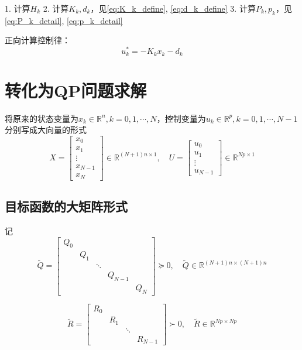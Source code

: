 \documentclass[withoutpreface,bwprint]{NoteBook}
\begin{document}
1. 计算$H_k$
2. 计算$K_k,d_k$，见\cref{eq:K_k_define}, \cref{eq:d_k_define} 
3. 计算$P_k,p_k$，见\cref{eq:P_k_detail}, \cref{eq:p_k_detail}

正向计算控制律：
$$
u_k^*= - K_k x_k - d_k 
$$

\section{转化为QP问题求解}

将原来的状态变量为$x_k \in \mathbb{R}^n,k=0,1,\cdots,N$，控制变量为$u_k \in \mathbb{R}^p,k=0,1,\cdots,N-1$分别写成大向量的形式
\begin{equation}
\label{eq:big_X_U_define}
X = \begin{bmatrix}
x_0 \\ x_1 \\ \vdots \\ x_{N-1} \\ x_N
\end{bmatrix} \in \mathbb{R}^{(N+1) n \times 1} 
,\quad
U = \begin{bmatrix}
u_0 \\ u_1 \\ \vdots \\ u_{N-1}
\end{bmatrix} \in \mathbb{R}^{N p \times 1} 
\end{equation}

\subsection{目标函数的大矩阵形式}

记
\begin{equation}
\label{eq:big_Q_define}
\tilde{Q} = \begin{bmatrix}
Q_0 & & & & \\
& Q_1 & & & \\
& & \ddots &&  \\
& & & Q_{N-1} & \\
& & & &  Q_N
\end{bmatrix} \succeq 0 
,\quad \tilde{Q} \in \mathbb{R}^{(N+1) n \times (N+1) n}
\end{equation}

\begin{equation}
\label{eq:big_R_define}
\tilde{R} = \begin{bmatrix}
R_0 & & & \\
& R_1 & &  \\
& & \ddots &  \\
& & & R_{N-1} 
\end{bmatrix} \succ 0 
,\quad \tilde{R} \in \mathbb{R}^{N p \times N p}
\end{equation}
\end{document}
